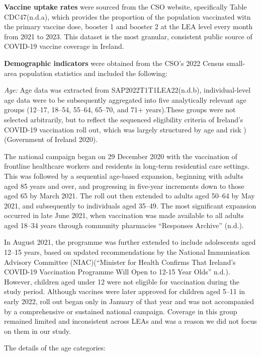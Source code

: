 \documentclass{article}
\begin{document}
\textbf{Vaccine uptake rates} were sourced from the CSO website,
specifically Table CDC47(n.d.a), which provides the proportion of the
population vaccinated witn the primary vaccine dose, booster 1 and
booster 2 at the LEA level every month from 2021 to 2023. This dataset
is the most granular, consistent public source of COVID-19 vaccine
coverage in Ireland.

\textbf{Demographic indicators} were obtained from the CSO's 2022 Census
small-area population statistics and included the following:

\emph{Age:} Age data was extracted from SAP2022T1T1LEA22(n.d.b),
individual-level age data were to be subsequently aggregated into five
analytically relevant age groups (12--17, 18--54, 55--64, 65--70, and
71+ years).These groups were not selected arbitrarily, but to reflect
the sequenced eligibility criteria of Ireland's COVID-19 vaccination
roll out, which was largely structured by age and risk )(Government of
Ireland 2020).

The national campaign began on 29 December 2020 with the vaccination of
frontline healthcare workers and residents in long-term residential care
settings. This was followed by a sequential age-based expansion,
beginning with adults aged 85 years and over, and progressing in
five-year increments down to those aged 65 by March 2021. The roll out
then extended to adults aged 50--64 by May 2021, and subsequently to
individuals aged 35--49. The most significant expansion occurred in late
June 2021, when vaccination was made available to all adults aged 18--34
years through community pharmacies {``Responses Archive''} (n.d.).

In August 2021, the programme was further extended to include
adolescents aged 12--15 years, based on updated recommendations by the
National Immunisation Advisory Committee (NIAC)({``Minister for {Health}
Confirms That {Ireland}'s {COVID}-19 {Vaccination} {Programme} Will Open
to 12-15 Year Olds''} n.d.). However, children aged under 12 were not
eligible for vaccination during the study period. Although vaccines were
later approved for children aged 5--11 in early 2022, roll out began
only in January of that year and was not accompanied by a comprehensive
or sustained national campaign. Coverage in this group remained limited
and inconsistent across LEAs and was a reason we did not focus on them
in our study.

The details of the age categories:
\end{document}
